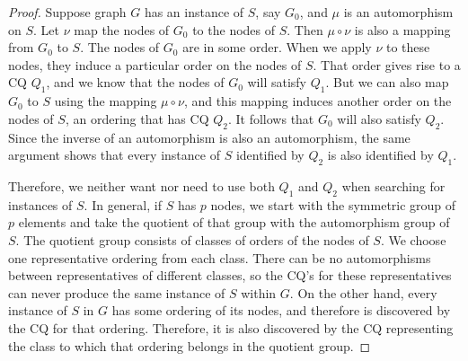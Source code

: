 \begin{proof}
Suppose graph $G$ has an instance of $S$, say $G_0$, and $\mu$ is an automorphism on $S$.  Let $\nu$ map the nodes of $G_0$ to the nodes of $S$.  Then $\mu\circ\nu$ is also a mapping from $G_0$ to $S$.  The nodes of $G_0$ are in some order.  When we apply $\nu$ to these nodes, they induce a particular order on the nodes of $S$.   That order gives rise to a CQ $Q_1$, and we know that the nodes of $G_0$ will satisfy $Q_1$.  But we can also map $G_0$ to $S$ using the mapping $\mu\circ\nu$, and this mapping induces another order on the nodes of $S$, an ordering that has CQ $Q_2$.  It follows that $G_0$ will also satisfy $Q_2$.  Since the inverse of an automorphism is also an automorphism, the same argument shows that every instance of $S$ identified by $Q_2$ is also identified by $Q_1$.

Therefore, we neither want nor need to use both $Q_1$ and $Q_2$ when searching for instances of $S$.  In general, if $S$ has $p$ nodes, we start with the symmetric group of $p$ elements and take the quotient of that group with the automorphism group of $S$.  The quotient group consists of classes of orders of the nodes of $S$.  We choose one representative ordering from each class.  There can be no automorphisms between representatives of different classes, so the CQ's for these representatives can never produce the same instance of $S$ within $G$.  On the other hand, every instance of $S$ in $G$ has some ordering of its nodes, and therefore is discovered by the CQ for that ordering.  Therefore, it is also discovered by the CQ representing the class to which that ordering belongs in the quotient group.
\end{proof}

